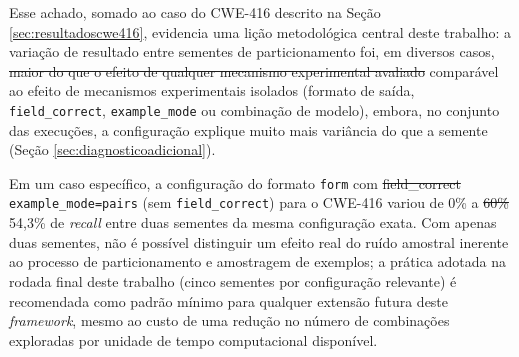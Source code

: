 \documentclass[
    12pt,                %
    openright,           %
    oneside,             %
    a4paper,             %
    english,             %
    brazil               %
]{abntex2}
\newcommand{\antigo}[1]{\sout{#1}}
\newcommand{\novo}[1]{{\color{red}#1}}
\begin{document}
\par
Esse achado, somado ao caso do CWE-416 descrito na Seção \ref{sec:resultadoscwe416}, evidencia uma lição metodológica central deste trabalho: a variação de resultado entre sementes de particionamento foi, em diversos casos, \antigo{maior do que o efeito de qualquer mecanismo experimental avaliado} \novo{comparável ao efeito de mecanismos experimentais isolados} (formato de saída, \texttt{field\_correct}, \texttt{example\_mode} ou combinação de modelo)\novo{, embora, no conjunto das execuções, a configuração explique muito mais variância do que a semente (Seção \ref{sec:diagnosticoadicional})}.
\par
Em um caso específico, a configuração do formato \texttt{form} com \antigo{field\_correct} \novo{\texttt{example\_mode=pairs} (sem \texttt{field\_correct})} para o CWE-416 variou de 0\% a \antigo{60\%} \novo{54,3\%} de \textit{recall} entre duas sementes da mesma configuração exata.
Com apenas duas sementes, não é possível distinguir um efeito real do ruído amostral inerente ao processo de particionamento e amostragem de exemplos; a prática adotada na rodada final deste trabalho (cinco sementes por configuração relevante) é recomendada como padrão mínimo para qualquer extensão futura deste \textit{framework}, mesmo ao custo de uma redução no número de combinações exploradas por unidade de tempo computacional disponível.
\end{document}
